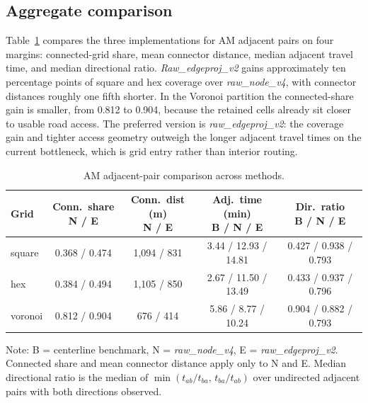 \documentclass[12pt]{article}
\begin{document}
	\subsection{Aggregate comparison}

Table~\ref{tab:rawgrid-method-comparison} compares the three implementations for AM adjacent pairs on four margins: connected-grid share, mean connector distance, median adjacent travel time, and median directional ratio. \emph{Raw\_edgeproj\_v2} gains approximately ten percentage points of square and hex coverage over \emph{raw\_node\_v4}, with connector distances roughly one fifth shorter. In the Voronoi partition the connected-share gain is smaller, from 0.812 to 0.904, because the retained cells already sit closer to usable road access. The preferred version is \emph{raw\_edgeproj\_v2}: the coverage gain and tighter access geometry outweigh the longer adjacent travel times on the current bottleneck, which is grid entry rather than interior routing.

	\begin{table}[h!]
		\centering
		\caption{AM adjacent-pair comparison across methods.}
		\label{tab:rawgrid-method-comparison}
		\begin{tabular}{@{}l c c c c@{}}
			\toprule
			Grid & \shortstack{Conn.\ share\\N / E} & \shortstack{Conn.\ dist (m)\\N / E} & \shortstack{Adj.\ time (min)\\B / N / E} & \shortstack{Dir.\ ratio\\B / N / E} \\
			\midrule
			square  & 0.368 / 0.474 & 1,094 / 831 & 3.44 / 12.93 / 14.81 & 0.427 / 0.938 / 0.793 \\
			hex     & 0.384 / 0.494 & 1,105 / 850 & 2.67 / 11.50 / 13.49 & 0.433 / 0.937 / 0.796 \\
			voronoi & 0.812 / 0.904 &   676 / 414 & 5.86 / 8.77 / 10.24 & 0.904 / 0.882 / 0.793 \\
			\bottomrule
		\end{tabular}
		\vspace{0.3em}
		\begin{minipage}{\textwidth}
			\footnotesize
			\raggedright
			Note: B = centerline benchmark, N = \emph{raw\_node\_v4}, E = \emph{raw\_edgeproj\_v2}. Connected share and mean connector distance apply only to N and E. Median directional ratio is the median of $\min(t_{ab}/t_{ba},\, t_{ba}/t_{ab})$ over undirected adjacent pairs with both directions observed.
		\end{minipage}
	\end{table}
\end{document}

